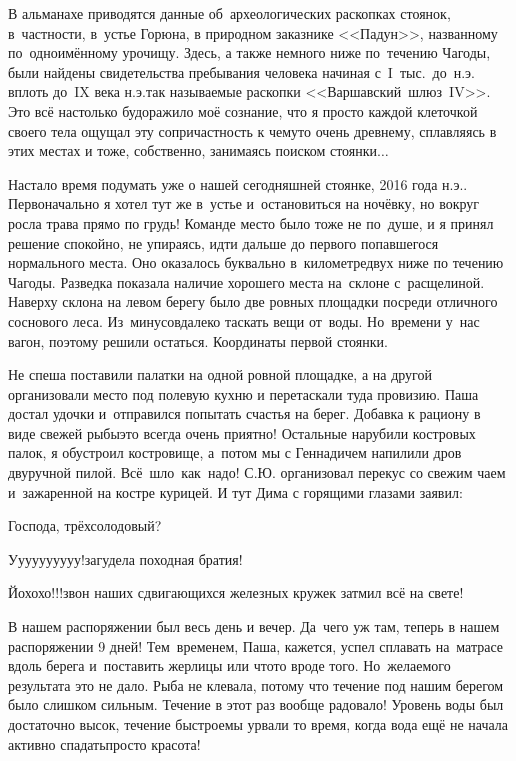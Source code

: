 В альманахе \cite{ЧагодаАльманахБашенькин} приводятся данные об~археологических раскопках стоянок, в~частности, в~устье Горюна, в природном заказнике <<Падун>>, названному по~одноимённому урочищу. Здесь, а также немного ниже по~течению Чагоды, были найдены свидетельства пребывания человека начиная с~I~тыс.~до~н.э. вплоть до~IX века н.э.\mdash так называемые раскопки <<Варшавский~шлюз~I\nbdash V>>. Это всё настолько будоражило моё сознание, что я просто каждой клеточкой своего тела ощущал эту сопричастность к чему\sdash то очень древнему, сплавляясь в этих местах и тоже, собственно, занимаясь поиском стоянки$\ldots$

Настало время подумать уже о нашей сегодняшней стоянке, 2016 года н.э.. Первоначально я хотел тут же в~устье и~остановиться на ночёвку, но вокруг росла трава прямо по грудь! Команде место было тоже не по~душе, и я принял решение спокойно, не упираясь, идти дальше до первого попавшегося нормального места. Оно оказалось буквально в~километре\sdash двух ниже по течению Чагоды. Разведка показала наличие хорошего места на~склоне с~расщелиной. Наверху склона на левом берегу было две ровных площадки посреди отличного соснового леса. Из~минусов\mdash далеко таскать вещи от~воды. Но~времени у~нас вагон, поэтому решили остаться. Координаты первой стоянки\mdash \CoordsChagodaSixteenFirst.

Не спеша поставили палатки на одной ровной площадке, а на другой организовали место под полевую кухню и перетаскали туда провизию. Паша достал удочки и~отправился попытать счастья на берег. Добавка к рациону в виде свежей рыбы\mdash это всегда очень приятно! Остальные нарубили костровых палок, я обустроил костровище, а~потом мы с Геннадичем напилили дров двуручной пилой. Всё~шло~как~надо! С.Ю. организовал перекус со свежим чаем и~зажаренной на костре курицей. И тут Дима с горящими глазами заявил:

\diagdash Господа, трёхсолодовый?

\diagdash У\sdash у\sdash у\sdash у\sdash у\sdash у\sdash у\sdash у\sdash у\sdash у!\mdash загудела походная братия! 

\diagdash Йо\sdash хо\sdash хо!!!\mdash звон наших сдвигающихся железных кружек затмил всё на свете! 

В нашем распоряжении был весь день и вечер. Да~чего уж там, теперь в нашем распоряжении 9\thinspace\nbdash{} дней! Тем~временем, Паша, кажется, успел сплавать на~матрасе вдоль берега и~поставить жерлицы или что\sdash то вроде того. Но~желаемого результата это не дало. Рыба не клевала, потому что течение под нашим берегом было слишком сильным. Течение в этот раз вообще радовало! Уровень воды был достаточно высок, течение быстрое\mdash мы урвали то время, когда вода ещё не начала активно спадать\mdash просто кра\sdash со\sdash та!
 
